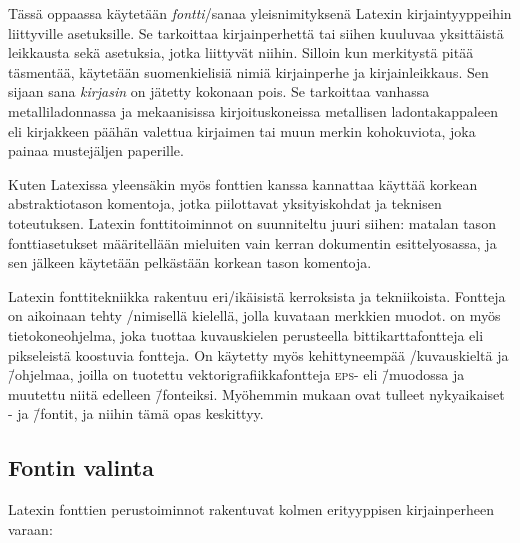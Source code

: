 Tässä oppaassa käytetään \emph{fontti}\-/sanaa yleisnimityksenä Latexin
kirjaintyyppeihin liittyville asetuksille. Se tarkoittaa kirjainperhettä
tai siihen kuuluvaa yksittäistä leikkausta sekä asetuksia, jotka
liittyvät niihin. Silloin kun merkitystä pitää täsmentää, käytetään
suomenkielisiä nimiä kirjainperhe ja kirjainleikkaus. Sen sijaan sana
\emph{kirjasin} on jätetty kokonaan pois. Se tarkoittaa vanhassa
metalliladonnassa ja mekaanisissa kirjoituskoneissa metallisen
ladontakappaleen eli kirjakkeen päähän valettua kirjaimen tai muun
merkin kohokuviota, joka painaa mustejäljen paperille.

Kuten Latexissa yleensäkin myös fonttien kanssa kannattaa käyttää
korkean abstraktiotason komentoja, jotka piilottavat yksityiskohdat ja
teknisen toteutuksen. Latexin fonttitoiminnot on suunniteltu juuri
siihen: matalan tason font\-ti\-ase\-tuk\-set määritellään mieluiten
vain kerran dokumentin esittelyosassa, ja sen jälkeen käytetään
pelkästään korkean tason komentoja.

Latexin fonttitekniikka rakentuu eri\-/ikäisistä kerroksista ja
tekniikoista. Fontteja on aikoinaan tehty
\-/nimisellä kielellä, jolla
kuvataan merkkien muodot.  on myös tietokoneohjelma,
joka tuottaa kuvauskielen perusteella bittikarttafontteja eli
pikseleistä koostuvia fontteja. On käytetty myös kehittyneempää
\-/kuvauskieltä ja \=/ohjelmaa,
joilla on tuotettu vek\-tori\-gra\-fiik\-ka\-font\-te\-ja \textsc{eps}-
eli  \=/muodossa ja muutettu niitä
edelleen  \=/fonteiksi. Myöhemmin mukaan
ovat tulleet nyky\-aikai\-set - ja  \=/fontit, ja niihin tämä opas keskittyy.

\subsection{Fontin valinta}
\label{luku:fontin_valinta}

Latexin fonttien perus\-toiminnot rakentuvat kolmen erityyppisen
kirjainperheen varaan:

